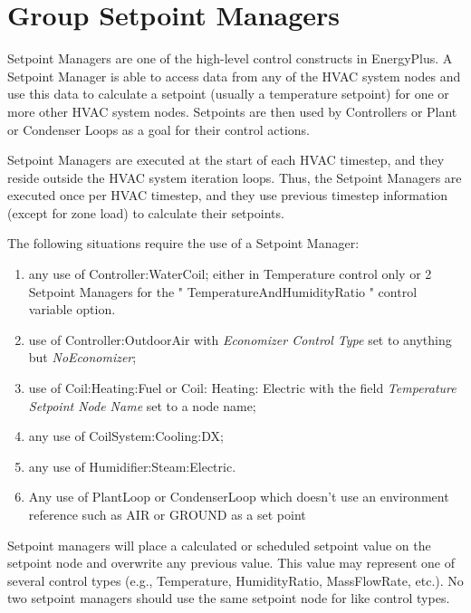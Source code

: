 \section{Group Setpoint Managers}\label{group-setpoint-managers}

Setpoint Managers are one of the high-level control constructs in EnergyPlus. A Setpoint Manager is able to access data from any of the HVAC system nodes and use this data to calculate a setpoint (usually a temperature setpoint) for one or more other HVAC system nodes. Setpoints are then used by Controllers or Plant or Condenser Loops as a goal for their control actions.

Setpoint Managers are executed at the start of each HVAC timestep, and they reside outside the HVAC system iteration loops. Thus, the Setpoint Managers are executed once per HVAC timestep, and they use previous timestep information (except for zone load) to calculate their setpoints.

The following situations require the use of a Setpoint Manager:

\begin{enumerate}
\def\labelenumi{\arabic{enumi})}
\item
  any use of Controller:WaterCoil; either in Temperature control only or 2 Setpoint Managers for the " TemperatureAndHumidityRatio " control variable option.
\item
  use of Controller:OutdoorAir with \emph{Economizer Control Type} set to anything but \emph{NoEconomizer};
\item
  use of Coil:Heating:Fuel or Coil: Heating: Electric with the field \emph{Temperature Setpoint Node Name} set to a node name;
\item
  any use of CoilSystem:Cooling:DX;
\item
  any use of Humidifier:Steam:Electric.
\item
  Any use of PlantLoop or CondenserLoop which doesn't use an environment reference such as AIR or GROUND as a set point
\end{enumerate}

Setpoint managers will place a calculated or scheduled setpoint value on the setpoint node and overwrite any previous value. This value may represent one of several control types (e.g., Temperature, HumidityRatio, MassFlowRate, etc.). No two setpoint managers should use the same setpoint node for like control types.

